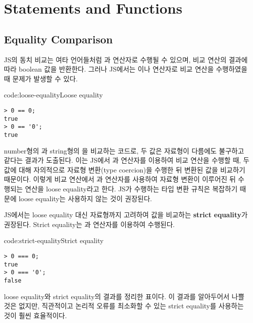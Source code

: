 \section{Statements and Functions}\label{statements-functions}

\subsection*{Equality Comparison}

JS의 동치 비교는 여타 언어들처럼 \cd{==}과 \cd{!=} 연산자로 수행될 수 있으며, 비교 연산의 결과에 따라 boolean 값을 반환한다. 그러나 JS에서는 \cd{==}이나 \cd{!=} 연산자로 비교 연산을 수행하였을 때 문제가 발생할 수 있다.

\begin{code}{code:loose-equality}{Loose equality}
\begin{verbatim}
> 0 == 0;
true
> 0 == '0';
true
\end{verbatim}
\end{code}

\는 number형의 과 string형의 을 비교하는 코드로, 두 값은 자료형이 다름에도 불구하고 같다는 결과가 도출된다. 이는 JS에서 \cd{==}과 \cd{!=} 연산자를 이용하여 비교 연산을 수행할 때, 두 값에 대해 자의적으로 자료형 변환(type coercion)을 수행한 뒤 변환된 값을 비교하기 때문이다. 이렇게 비교 연산에서 \cd{==}과 \cd{!=} 연산자를 사용하여 자료형 변환이 이루어진 뒤 수행되는 연산을 loose equality라고 한다. JS가 수행하는 타입 변환 규칙은 복잡하기 때문에 loose equality는 사용하지 않는 것이 권장된다.


JS에서는 loose equality 대신 자료형까지 고려하여 값을 비교하는 \textbf{strict equality}가 권장된다. Strict equality는 \cd{===}과 \cd{!==} 연산자를 이용하여 수행된다.

\begin{code}{code:strict-equality}{Strict equality}
\begin{verbatim}
> 0 === 0;
true
> 0 === '0';
false
\end{verbatim}
\end{code}

\은 loose equality와 strict equality의 결과를 정리한 표이다. 이 결과를 알아두어서 나쁠 것은 없지만, 직관적이고 논리적 오류를 최소화할 수 있는 strict equality를 사용하는 것이 훨씬 효율적이다.

